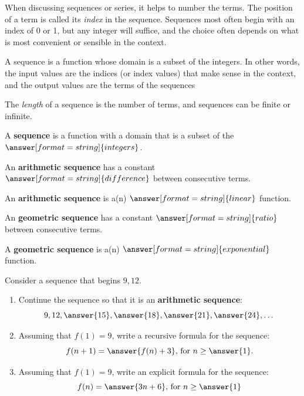 \documentclass[handout,space,nooutcomes]{ximera}
\begin{document}
\begin{question}
When discussing sequences or series, it helps to number the terms.  The position of a term is called its \emph{index} in the sequence.  Sequences most often begin with an index of 0 or 1, but any integer will suffice, and the choice often depends on what is most convenient or sensible in the context. 

A sequence is a function whose domain is a subset of the integers.  In other words, the input values are the indices (or index values) that make sense in the context, and the output values are the terms of the sequences

The \emph{length} of a sequence is the number of terms, and sequences can be finite or infinite.  



\begin{question}
A \textbf{sequence} is a function with a domain that is a subset of the $\answer[format=string]{integers}$.  

An \textbf{arithmetic sequence} has a constant $\answer[format=string]{difference}$ between consecutive terms. 

An \textbf{arithmetic sequence} is a(n) $\answer[format=string]{linear}$ function. 

An \textbf{geometric sequence} has a constant $\answer[format=string]{ratio}$ between consecutive terms. 

A \textbf{geometric sequence} is a(n) $\answer[format=string]{exponential}$ function. 

\end{question}
\end{question}



\begin{problem}
Consider a sequence that begins $9, 12$.    
\begin{enumerate}
\item Continue the sequence so that it is an \textbf{arithmetic sequence}:
\[
9, 12, \answer{15}, \answer{18}, \answer{21}, \answer{24}, \dots
\]
\item Assuming that $f(1)=9$, write a recursive formula for the sequence:
\[
f(n+1)=\answer{f(n)+3}\textrm{, for }n\ge\answer{1}.
\]
\item Assuming that $f(1)=9$, write an explicit formula for the sequence: 
\[
f(n)=\answer{3n+6}\textrm{, for }n\ge\answer{1}
\]
\end{enumerate}
\end{problem}
\end{document}
